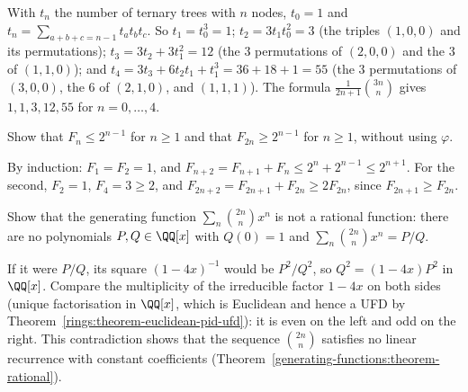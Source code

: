 \begin{solution}
With $t_n$ the number of ternary trees with $n$ nodes, $t_0 = 1$ and $t_n = \sum_{a+b+c=n-1}t_at_bt_c$. So $t_1 = t_0^3 = 1$; $t_2 = 3t_1t_0^2 = 3$ (the triples $(1, 0, 0)$ and its permutations);
$t_3 = 3t_2 + 3t_1^2 = 12$ (the $3$ permutations of $(2, 0, 0)$ and the $3$ of $(1, 1, 0)$); and $t_4 = 3t_3 + 6t_2t_1 + t_1^3 = 36 + 18 + 1 = 55$ (the $3$ permutations of $(3, 0, 0)$, the $6$ of
$(2, 1, 0)$, and $(1, 1, 1)$).
The formula $\frac{1}{2n + 1}\binom{3n}{n}$ gives $1, 1, 3, 12, 55$ for $n = 0, \ldots, 4$.
\end{solution}

\begin{exercise}\label{generating-functions:exercise-fibonacci-growth}
Show that $F_n \leq 2^{n-1}$ for $n \geq 1$ and that $F_{2n} \geq 2^{n-1}$ for $n \geq 1$, without using $\varphi$.
\end{exercise}

\begin{solution}
By induction: $F_1 = F_2 = 1$, and $F_{n+2} = F_{n+1} + F_n \leq 2^n + 2^{n-1} \leq 2^{n+1}$. For the second, $F_2 = 1$, $F_4 = 3 \geq 2$, and $F_{2n+2} = F_{2n+1} + F_{2n} \geq 2F_{2n}$, since
$F_{2n+1} \geq F_{2n}$.
\end{solution}

\begin{exercise}\label{generating-functions:exercise-not-rational}
Show that the generating function $\sum_n\binom{2n}{n}x^n$ is not a rational function: there are no polynomials $P, Q \in \QQ[x]$ with $Q(0) = 1$ and $\sum_n\binom{2n}{n}x^n = P/Q$.
\end{exercise}

\begin{solution}
If it were $P/Q$, its square $(1 - 4x)^{-1}$ would be $P^2/Q^2$, so $Q^2 = (1 - 4x)P^2$ in $\QQ[x]$. Compare the multiplicity of the irreducible factor $1 - 4x$ on both sides (unique factorisation
in $\QQ[x]$, which is Euclidean and hence a UFD by Theorem~\ref{rings:theorem-euclidean-pid-ufd}): it is even on the left and odd on the right. This contradiction shows that the sequence $\binom{2n}{n}$ satisfies no linear recurrence with constant
coefficients (Theorem~\ref{generating-functions:theorem-rational}).
\end{solution}
